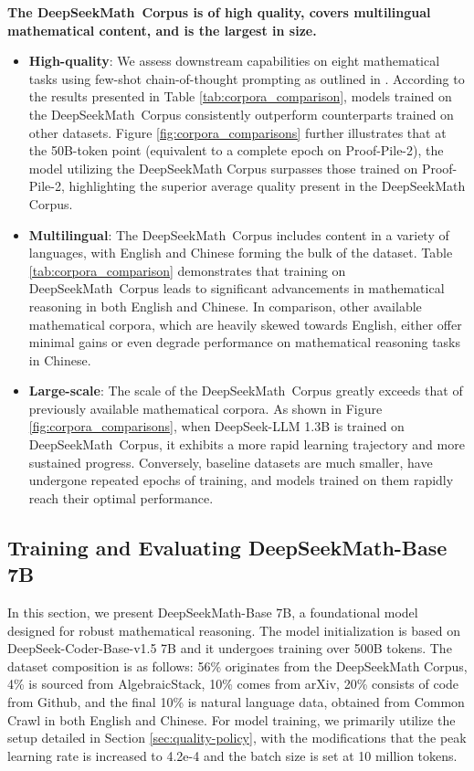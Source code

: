 \begin{itemize}[topsep=0pt]
\textbf{The DeepSeekMath~Corpus is of high quality, covers multilingual mathematical content, and is the largest in size.}

\begin{itemize}[topsep=0pt]
    \item \textbf{High-quality}:
    We assess downstream capabilities on eight mathematical tasks using few-shot chain-of-thought prompting as outlined in \cite{cot}. According to the results presented in Table \ref{tab:corpora_comparison}, models trained on the DeepSeekMath~Corpus consistently outperform counterparts trained on other datasets. Figure \ref{fig:corpora_comparisons} further illustrates that at the 50B-token point (equivalent to a complete epoch on Proof-Pile-2), the model utilizing the DeepSeekMath Corpus surpasses those trained on Proof-Pile-2, highlighting the superior average quality present in the DeepSeekMath Corpus.
    \item \textbf{Multilingual}:
    The DeepSeekMath~Corpus includes content in a variety of languages, with English and Chinese forming the bulk of the dataset. Table \ref{tab:corpora_comparison} demonstrates that training on DeepSeekMath~Corpus leads to significant advancements in mathematical reasoning in both English and Chinese. In comparison, other available mathematical corpora, which are heavily skewed towards English, either offer minimal gains or even degrade performance on mathematical reasoning tasks in Chinese.
    \item \textbf{Large-scale}:
    The scale of the DeepSeekMath~Corpus greatly exceeds that of previously available mathematical corpora. As shown in Figure \ref{fig:corpora_comparisons}, when DeepSeek-LLM 1.3B is trained on DeepSeekMath~Corpus, it exhibits a more rapid learning trajectory and more sustained progress. Conversely, baseline datasets are much smaller, have undergone repeated epochs of training, and models trained on them rapidly reach their optimal performance.
\end{itemize}

\subsection{Training and Evaluating DeepSeekMath-Base 7B}

In this section, we present DeepSeekMath-Base 7B, a foundational model designed for robust mathematical reasoning. The model initialization is based on DeepSeek-Coder-Base-v1.5 7B \citep{deepseek-coder} and it undergoes training over 500B tokens. The dataset composition is as follows: 56\% originates from the DeepSeekMath Corpus, 4\% is sourced from AlgebraicStack, 10\% comes from arXiv, 20\% consists of code from Github, and the final 10\% is natural language data, obtained from Common Crawl in both English and Chinese. For model training, we primarily utilize the setup detailed in Section \ref{sec:quality-policy}, with the modifications that the peak learning rate is increased to 4.2e-4 and the batch size is set at 10 million tokens.


\end{itemize}
